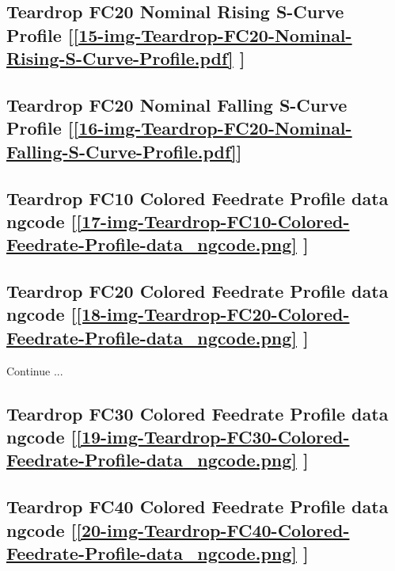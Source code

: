 \subsection     {Teardrop FC20 Nominal Rising S-Curve Profile
	[\ref      {15-img-Teardrop-FC20-Nominal-Rising-S-Curve-Profile.pdf} ] }
\label{ssec-15-img-Teardrop-FC20-Nominal-Rising-S-Curve-Profile.pdf}

\subsection     {Teardrop FC20 Nominal Falling S-Curve Profile
	[\ref      {16-img-Teardrop-FC20-Nominal-Falling-S-Curve-Profile.pdf}] }
\label{ssec-16-img-Teardrop-FC20-Nominal-Falling-S-Curve-Profile.pdf}

\subsection       {Teardrop FC10 Colored Feedrate Profile data ngcode
	[\ref      {17-img-Teardrop-FC10-Colored-Feedrate-Profile-data_ngcode.png} ] }
\label{ssec-17-img-Teardrop-FC10-Colored-Feedrate-Profile-data_ngcode.png}

\subsection       {Teardrop FC20 Colored Feedrate Profile data ngcode
	[\ref      {18-img-Teardrop-FC20-Colored-Feedrate-Profile-data_ngcode.png} ] }
\label{ssec-18-img-Teardrop-FC20-Colored-Feedrate-Profile-data_ngcode.png}

Continue ...\\

\subsection       {Teardrop FC30 Colored Feedrate Profile data ngcode
	[\ref      {19-img-Teardrop-FC30-Colored-Feedrate-Profile-data_ngcode.png} ] }
\label{ssec-19-img-Teardrop-FC30-Colored-Feedrate-Profile-data_ngcode.png}

\subsection       {Teardrop FC40 Colored Feedrate Profile data ngcode
	[\ref      {20-img-Teardrop-FC40-Colored-Feedrate-Profile-data_ngcode.png} ] }
\label{ssec-20-img-Teardrop-FC40-Colored-Feedrate-Profile-data_ngcode.png}

